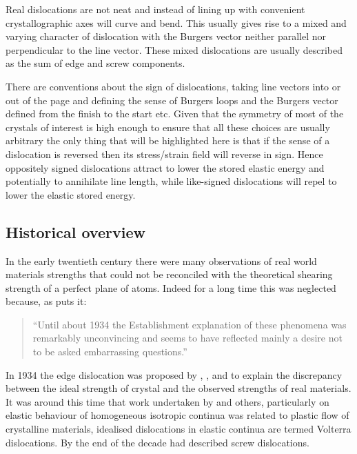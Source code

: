 Real dislocations are not neat and instead of lining up with convenient crystallographic axes will curve and bend. This usually gives rise to a mixed and varying character of dislocation with the Burgers vector neither parallel nor perpendicular to the line vector. These mixed dislocations are usually described as the sum of edge and screw components.

There are conventions about the sign of dislocations, taking line vectors into or out of the page and defining the sense of Burgers loops and the Burgers vector defined from the finish to the start etc. Given that the symmetry of most of the crystals of interest is high enough to ensure that all these choices are usually arbitrary the only thing that will be highlighted here is that if the sense of a dislocation is reversed then its stress/strain field will reverse in sign. Hence oppositely signed dislocations attract to lower the stored elastic energy and potentially to annihilate line length, while like-signed dislocations will repel to lower the elastic stored energy.



\FloatBarrier

\subsection{Historical overview}


In the early twentieth century there were many observations of real world materials strengths that could not be reconciled with the theoretical shearing strength of a perfect plane of atoms. Indeed for a long time this was neglected because, as \citet{gordon1991} puts it:
\begin{quote}
``Until about 1934 the Establishment explanation of these phenomena was remarkably unconvincing and seems to have reflected mainly a desire not to be asked embarrassing questions.''
\end{quote}

In 1934 the edge dislocation was proposed by \cite{orowan1934i,Orowan1934ii,Orowan1934iii}, \citet{Taylor1934}, and \citet{polanyi1934} to explain the discrepancy between the ideal strength of crystal and the observed strengths of real materials. It was around this time that work undertaken by \citet{Volterra1907} and others, particularly \citet{love1920}
on elastic behaviour of homogeneous isotropic continua was related to plastic flow of crystalline materials, idealised dislocations in elastic continua are termed Volterra dislocations. By the end of the decade \citet{burgers1939} had described screw dislocations. 

